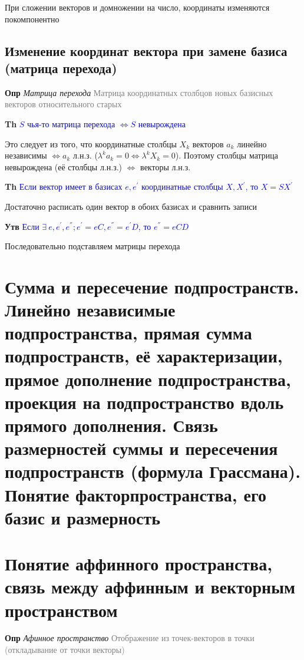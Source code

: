 \documentclass[a4paper, 14pt]{article}
\begin{document}
    При сложении векторов и домножении на число, координаты изменяются покомпонентно

    \subsection{Изменение координат вектора при замене базиса (матрица перехода)}

    \textbf{Опр} \textit{Матрица перехода} \textcolor{gray}{Матрица координатных столбцов новых базисных векторов
    относительного старых}

    \textbf{Th} \textcolor{blue}{$S$ чья-то матрица перехода $\Leftrightarrow S$ невырождена}

    Это следует из того, что координатные столбцы $X_k$ векторов $a_k$ линейно независимы $\Leftrightarrow a_k$ л.н.з.
    ($\lambda^k a_k = 0 \Leftrightarrow \lambda^k X_k = 0$).
    Поэтому столбцы матрица невырождена (её столбцы л.н.з.) $\Leftrightarrow$ векторы л.н.з.

    \textbf{Th} \textcolor{blue}{Если вектор имеет в базисах $e, e^{'}$ координатные столбцы $X, X^{'}$, то $X = SX^{'}$}

    Достаточно расписать один вектор в обоих базисах и сравнить записи

    \textbf{Утв} \textcolor{blue}{Если $\exists~e, e^{'}, e^{''}; e^{'} = eC, e^{''} = e^{'}D$, то $e^{''} = eCD$}

    Последовательно подставляем матрицы перехода

    \section{Сумма и пересечение подпространств.
    Линейно независимые подпространства, прямая сумма подпространств, её характеризации, прямое дополнение
    подпространства, проекция на подпространство вдоль прямого дополнения.
    Связь размерностей суммы и пересечения подпространств (формула Грассмана).
    Понятие факторпространства, его базис и размерность}

    


    \section{Понятие аффинного пространства, связь между аффинным и векторным пространством}

    \textbf{Опр} \textit{Афинное пространство} \textcolor{gray}{Отображение из точек-векторов в точки (откладывание
    от точки векторы)}
\end{document}
